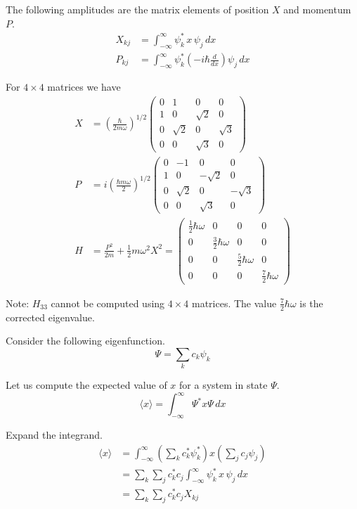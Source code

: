 \documentclass[12pt]{article}
\begin{document}
\noindent
The following amplitudes are the matrix elements of position $X$ and momentum $P$.
\begin{align*}
X_{kj}&=\int_{-\infty}^\infty \psi_k^*\,x\,\psi_j\,dx
\\[1ex]
P_{kj}&=\int_{-\infty}^\infty \psi_k^*\left(-i\hbar\frac{d}{dx}\right)\psi_j\,dx
\end{align*}

\noindent
For $4\times4$ matrices we have
\begin{align*}
X&=\left(\frac{\hbar}{2m\omega}\right)^{1/2}
\begin{pmatrix}
0 & 1 & 0 & 0
\\
1 & 0 & \sqrt{2} & 0
\\
0 & \sqrt{2} & 0 & \sqrt{3}
\\
0 & 0 & \sqrt{3} & 0
\end{pmatrix}
\\[1ex]
P&=i\left(\frac{\hbar m\omega}{2}\right)^{1/2}
\begin{pmatrix}
0 & -1 & 0 & 0
\\
1 & 0 & -\sqrt{2} & 0
\\
0 & \sqrt{2} & 0 & -\sqrt{3}
\\
0 & 0 & \sqrt{3} & 0
\end{pmatrix}
\\[1ex]
H&=\frac{P^2}{2m}+\frac{1}{2}m\omega^2 X^2
=\begin{pmatrix}
\tfrac{1}{2}\hbar\omega & 0 & 0 & 0
\\
0 & \tfrac{3}{2}\hbar\omega & 0 & 0
\\
0 & 0 & \tfrac{5}{2}\hbar\omega & 0
\\
0 & 0 & 0 & \tfrac{7}{2}\hbar\omega
\end{pmatrix}
\end{align*}

\noindent
Note: $H_{33}$ cannot be computed using $4\times4$ matrices.
The value $\tfrac{7}{2}\hbar\omega$ is the corrected eigenvalue.

\bigskip
\noindent
Consider the following eigenfunction.
\begin{equation*}
\Psi=\sum_k c_k\psi_k
\end{equation*}

\noindent
Let us compute the expected value of $x$ for a system in state $\Psi$.
\begin{equation*}
\langle x\rangle=\int_{-\infty}^\infty \Psi^* x\Psi\,dx
\end{equation*}

\noindent
Expand the integrand.
\begin{align*}
\langle x\rangle
&=\int_{-\infty}^\infty
\left(\sum_kc_k^*\psi_k^*\right) x \left(\sum_j c_j\psi_j\right)
\\
&=\sum_k\sum_jc_k^*c_j\int_{-\infty}^\infty\psi_k^*\,x\,\psi_j\,dx
\\
&=\sum_k\sum_jc_k^*c_j X_{kj}
\end{align*}
\end{document}

